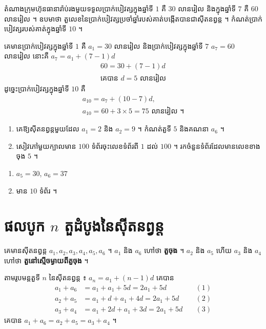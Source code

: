 \begin{example}[លំហាត់គំរូ ២]
តំណាងក្រុមហ៊ុនធានារ៉ាប់រងមួយទទួលប្រាក់បៀវត្សក្នុងឆ្នាំទី $1$ គឺ $30$ លានរៀល និងក្នុងឆ្នាំទី $7$ គឺ $60$ លានរៀល ។ ឧបមាថា តួលេខនៃប្រាក់បៀវត្សប្រចាំឆ្នាំរបស់គាត់បង្កើតបានជាស៊ីតនព្វន្ត ។ កំណត់ប្រាក់បៀវត្សរបស់គាត់ក្នុងឆ្នាំទី $10$ ។
\end{example}
\ans
គេមានប្រាក់បៀវត្សក្នុងឆ្នាំទី $1$ គឺ $a_1 = 30$ លានរៀល និងប្រាក់បៀវត្សក្នុងឆ្នាំទី $7$ $a_7 = 60$ លានរៀល នោះគឺ $a_7 = a_1 + (7 - 1)d$
\[
\begin{gathered}
60 = 30 + (7 - 1)d\\
\text{គេបាន } d = 5 \text{ លានរៀល}
\end{gathered}
\]
ដូច្នេះប្រាក់បៀវត្សក្នុងឆ្នាំទី $10$ គឺ
\[
\begin{gathered}
a_{10} = a_7 + (10 - 7)d,\\
a_{10} = 60 + 3 \times 5 = 75 \text{ លានរៀល ។}
\end{gathered}
\]

\begin{pro}
\begin{enumerate}[a]
  \item គេឱ្យស៊ីតនព្វន្តមួយដែល $a_1 = 2$ និង $a_2 = 9$ ។ កំណត់តួទី $5$ និងគណនា $a_6$ ។
  \item សៀវភៅមួយក្បាលមាន $100$ ទំព័រចុះលេខទំព័រពី $1$ ដល់ $100$ ។ រកចំនួនទំព័រដែលមានលេខខាងចុង $5$ ។
\end{enumerate}
\ans
\begin{enumerate}[a]
  \item $a_5 = 30$, $a_6 = 37$
  \item មាន $10$ ទំព័រ ។
\end{enumerate}
\end{pro}

\section{ផលបូក \texorpdfstring{$n$}{n} តួដំបូងនៃស៊ីតនព្វន្ត}

គេមានស៊ីតនព្វន្ត $a_1, a_2, a_3, a_4, a_5, a_6$ ។ $a_1$ និង $a_6$ ហៅថា \textbf{តួចុង} ។ $a_2$ និង $a_5$ ហើយ $a_3$ និង $a_4$ ហៅថា \textbf{តួនៅស្មើចម្ងាយពីតួចុង} ។

តាមរូបមន្តតួទី $n$ នៃស៊ីតនព្វន្ត ៖ $a_n = a_1 + (n - 1)d$ គេបាន
\[
\begin{aligned}
a_1 + a_6 &= a_1 + a_1 + 5d = 2a_1 + 5d &\quad (1)\\
a_2 + a_5 &= a_1 + d + a_1 + 4d = 2a_1 + 5d &\quad (2)\\
a_3 + a_4 &= a_1 + 2d + a_1 + 3d = 2a_1 + 5d &\quad (3)
\end{aligned}
\]
គេបាន $a_1 + a_6 = a_2 + a_5 = a_3 + a_4$ ។

